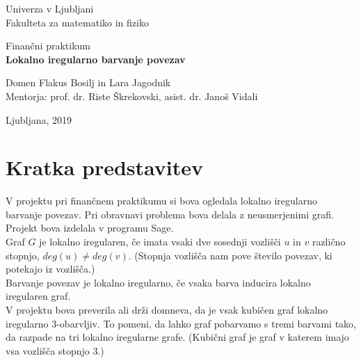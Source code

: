 \documentclass[12pt, a4paper]{article}
\begin{document}
\begin{titlepage}
\begin{center}

\large
Univerza v Ljubljani\\
\normalsize
Fakulteta za matematiko in fiziko\\

\vspace{5 cm} 

\large
Finančni praktikum \\


\vspace{0.5cm}
\LARGE
\textbf{Lokalno iregularno barvanje povezav}

\vspace{0.5 cm}

\large
Domen Flakus Bosilj in Lara Jagodnik \\


\vspace{1.5cm}
\normalsize
Mentorja: prof. dr. Riste Škrekovski, asist. dr. Janoš Vidali
\vspace{3cm}


\vfill

\large Ljubljana, 2019

\end{center}
\end{titlepage}


\newpage

\section{Kratka predstavitev}

V projektu pri finančnem praktikumu si bova ogledala lokalno iregularno barvanje povezav. Pri obravnavi problema bova delala z neusmerjenimi grafi. Projekt bova izdelala v programu Sage. \\
Graf $G$ je lokalno iregularen, če imata vsaki dve sosednji vozlišči $u$ in $v$ različno stopnjo, $deg(u) \neq deg(v)$. (Stopnja vozlišča nam pove število povezav, ki potekajo iz vozlišča.) \\
Barvanje povezav je lokalno iregularno, če vsaka barva inducira lokalno iregularen graf. \\
V projektu bova preverila ali drži domneva, da je vsak kubičen graf lokalno iregularno 3-obarvljiv. To pomeni, da lahko graf pobarvamo s tremi barvami tako, da razpade na tri lokalno iregularne grafe. (Kubični graf je graf v katerem imajo vsa vozlišča stopnjo 3.)\\
\end{document}
